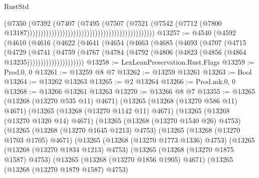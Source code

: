 \begin{lexlean}{RustStd}
\begin{coremodule}
                                                                                (@7350
                                                                                  (@7392
                                                                                    (@7407
                                                                                      (@7495
                                                                                        (@7507
                                                                                          (@7521
                                                                                            (@7542
                                                                                              (@7712
                                                                                                (@7800
                                                                                                  @13187)))))))))))))))))))))))))))))))))))))))))))))))
@13257 := @4540
    (@4592
      (@4610
        (@4616
          (@4622
            (@4641
              (@4654
                (@4663
                  (@4685
                    (@4693
                      (@4707
                        (@4715
                          (@4729
                            (@4741
                              (@4759
                                (@4767
                                  (@4784
                                    (@4792 (@4806 (@4823 (@4856 (@4864 @13235)))))))))))))))))))))
@13258 := LexLeanPreservation.Rust.Flags
@13259 := Prod.{0, 0}
@13261 := @13259 @8 @7
@13262 := @13259 @13261
@13263 := Bool
@13264 := @13262 @13263
@13265 := @2 @13264
@13266 := Prod.mk.{0, 0}
@13268 := @13266 @13261 @13263
@13270 := @13266 @8 @7
@13355 := @13265
    (@13268 (@13270 @535 @11) @4671)
    (@13265
      (@13268 (@13270 @586 @11) @4671)
      (@13265
        (@13268 (@13270 @1142 @11) @4671)
        (@13265
          (@13268 (@13270 @1320 @14) @4671)
          (@13265
            (@13268 (@13270 @1540 @26) @4753)
            (@13265
              (@13268 (@13270 @1645 @1213) @4753)
              (@13265
                (@13268 (@13270 @1703 @1705) @4671)
                (@13265
                  (@13268 (@13270 @1773 @1336) @4753)
                  (@13265
                    (@13268 (@13270 @1834 @1213) @4753)
                    (@13265
                      (@13268 (@13270 @1875 @1587) @4753)
                      (@13265
                        (@13268 (@13270 @1856 @1905) @4671)
                        (@13265
                          (@13268 (@13270 @1879 @1587) @4753)

\end{coremodule}
\end{lexlean}
